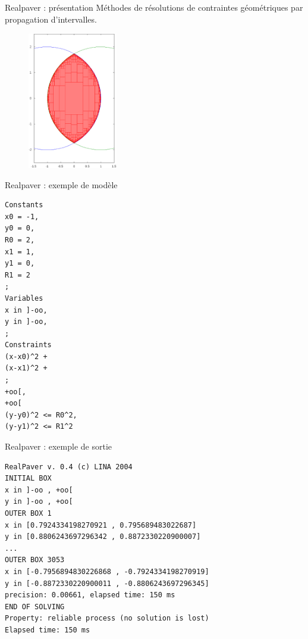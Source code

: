 \documentclass[frames,pdf,slideColor,colorBG,accumulate,total]{prosper}
\newcommand{\slidetextsize}{\footnotesize}
\begin{document}
  \begin{slide}[Box]{Realpaver : présentation}
    \slidetextsize
    Méthodes de résolutions de contraintes géométriques par propagation d’intervalles.
   \begin{figure}[t]\centering \includegraphics[width=0.35\textwidth]{img/disk-disk.ps}\end{figure}
  \end{slide}
\begin{slide}{Realpaver : exemple de modèle}
\hypertarget{code}{ }
\tiny\vspace{-.35in}\hspace{-.35in}
\begin{verbatim}
Constants
x0 = -1,
y0 = 0,
R0 = 2,
x1 = 1,
y1 = 0,
R1 = 2
;
Variables
x in ]-oo,
y in ]-oo,
;
Constraints
(x-x0)^2 +
(x-x1)^2 +
;
+oo[,
+oo[
(y-y0)^2 <= R0^2,
(y-y1)^2 <= R1^2
\end{verbatim}
\end{slide}
\begin{slide}{Realpaver : exemple de sortie}
\hypertarget{code}{ }
\tiny\vspace{-.35in}
\begin{verbatim}
RealPaver v. 0.4 (c) LINA 2004
INITIAL BOX
x in ]-oo , +oo[
y in ]-oo , +oo[
OUTER BOX 1
x in [0.7924334198270921 , 0.795689483022687]
y in [0.8806243697296342 , 0.8872330220900007]
...
OUTER BOX 3053
x in [-0.7956894830226868 , -0.7924334198270919]
y in [-0.8872330220900011 , -0.8806243697296345]
precision: 0.00661, elapsed time: 150 ms
END OF SOLVING
Property: reliable process (no solution is lost)
Elapsed time: 150 ms
\end{verbatim}
\end{slide}
\end{document}
